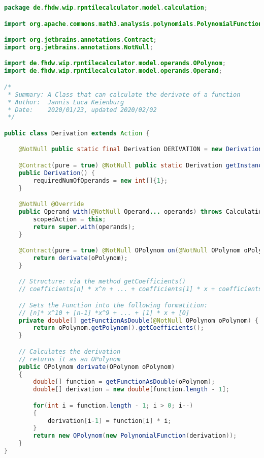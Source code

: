 \begin{lstlisting}[caption=Derivation (Keienburg),label=list:Derivation,language=Java]
package de.fhdw.wip.rpntilecalculator.model.calculation;

import org.apache.commons.math3.analysis.polynomials.PolynomialFunction;

import org.jetbrains.annotations.Contract;
import org.jetbrains.annotations.NotNull;

import de.fhdw.wip.rpntilecalculator.model.operands.OPolynom;
import de.fhdw.wip.rpntilecalculator.model.operands.Operand;

/*
 * Summary: A Class that can calculate the derivate of a function
 * Author:  Jannis Luca Keienburg
 * Date:    2020/01/23, updated 2020/02/02
 */

public class Derivation extends Action {

    @NotNull public static final Derivation DERIVATION = new Derivation();

    @Contract(pure = true) @NotNull public static Derivation getInstance() { return DERIVATION; }
    public Derivation() {
        requiredNumOfOperands = new int[]{1};
    }

    @NotNull @Override
    public Operand with(@NotNull Operand... operands) throws CalculationException {
        scopedAction = this;
        return super.with(operands);
    }

    @Contract(pure = true) @NotNull OPolynom on(@NotNull OPolynom oPolynom) {
        return derivate(oPolynom);
    }

    // Structure: via the method getCoefficients()
    // coefficients[n] * x^n + ... + coefficients[1] * x + coefficients[0]

    // Sets the Function into the following formatition:
    // [n]* x^10 + [n-1] *x^9 + ... + [1] * x + [0]
    private double[] getFunctionAsDouble(@NotNull OPolynom oPolynom) {
        return oPolynom.getPolynom().getCoefficients();
    }

    // Calculates the derivation
    // returns it as an OPolynom
    public OPolynom derivate(OPolynom oPolynom)
    {
        double[] function = getFunctionAsDouble(oPolynom);
        double[] derivation = new double[function.length - 1];

        for(int i = function.length - 1; i > 0; i--)
        {
            derivation[i-1] = function[i] * i;
        }
        return new OPolynom(new PolynomialFunction(derivation));
    }
}
\end{lstlisting}    

